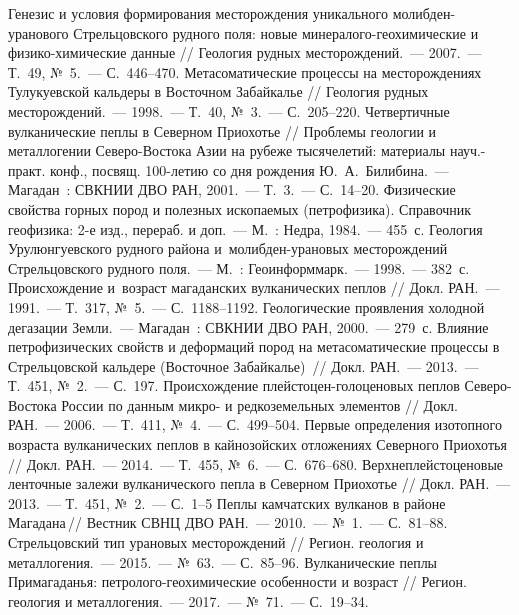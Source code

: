 \begin{thebibliography}{99}
\bibitem{} Генезис и условия формирования месторождения уникального молибден-уранового Стрельцовского рудного поля: новые минералого-геохимические и физико-химические данные // Геология рудных месторождений.~--- 2007.~--- Т.~49, №~5.~--- С.~446--470.
\bibitem{} Метасоматические процессы на месторождениях Тулукуевской кальдеры в Восточном Забайкалье // Геология рудных месторождений.~--- 1998.~--- Т.~40, №~3.~--- С.~205--220.
\bibitem{} Четвертичные вулканические пеплы в Северном Приохотье // Проблемы геологии и металлогении Северо-Востока Азии на рубеже тысячелетий: материалы науч.-практ. конф., посвящ. 100-летию со дня рождения Ю.~А.~Билибина.~--- Магадан~: СВКНИИ ДВО РАН, 2001.~--- Т.~3.~--- С.~14--20.
\bibitem{} Физические свойства горных пород и полезных ископаемых (петрофизика). Справочник геофизика: 2-е изд., перераб. и доп.~--- М.~: Недра, 1984.~--- 455~с.
\bibitem{} Геология Урулюнгуевского рудного района и~молибден-урановых месторождений Стрельцовского рудного поля.~--- М.~: Геоинформмарк.~--- 1998.~--- 382~с.
\bibitem{} Происхождение и~возраст магаданских вулканических пеплов // Докл. РАН.~--- 1991.~--- Т.~317, №~5.~--- С.~1188--1192.
\bibitem{} Геологические проявления холодной дегазации Земли.~--- Магадан~: СВКНИИ ДВО РАН, 2000.~--- 279~с.
\bibitem{} Влияние петрофизических свойств и деформаций пород на метасоматические процессы в Стрельцовской кальдере (Восточное Забайкалье)~// Докл. РАН.~---  2013.~--- Т.~451, №~2.~--- С.~197.
\bibitem{} Происхождение плейстоцен-голоценовых пеплов Северо-Востока России по данным микро- и редкоземельных элементов // Докл. РАН.~--- 2006.~--- Т.~411, №~4.~--- С.~499--504.
\bibitem{} Первые определения изотопного возраста вулканических пеплов в кайнозойских отложениях Северного Приохотья // Докл. РАН.~--- 2014.~--- Т.~455, №~6.~--- С.~676--680.
\bibitem{} Верхнеплейстоценовые ленточные залежи вулканического пепла в Северном Приохотье // Докл. РАН.~--- 2013.~--- Т.~451, №~2.~--- С.~1--5
\bibitem{} Пеплы камчатских вулканов в районе Магадана\,// Вестник СВНЦ ДВО РАН.~--- 2010.~--- №~1.~--- С.~81--88.
\bibitem{} Стрельцовский тип урановых месторождений // Регион. геология и металлогения.~--- 2015.~--- №~63.~--- С.~85--96.
\bibitem{} Вулканические пеплы Примагаданья: петролого-геохимические особенности и возраст // Регион. геология и металлогения.~--- 2017.~--- №~71.~--- С.~19--34.

\end{thebibliography}
